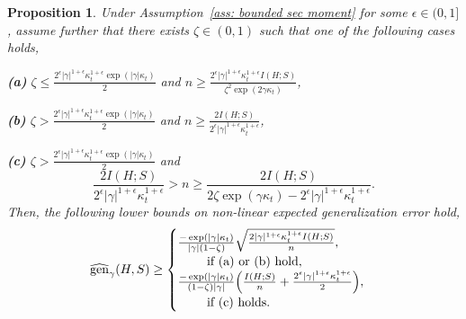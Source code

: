 \documentclass{article}
\theoremstyle{plain}
\theoremstyle{plain}
\newtheorem{proposition}[theorem]{Proposition}
\theoremstyle{definition}
\theoremstyle{remark}
\begin{document}
\begin{proposition}\label{prop: lower via Mutual V2 unbound}
Under Assumption~\ref{ass: bounded sec moment} for some $\epsilon\in(0,1]$, assume further that there exists $\zeta\in(0,1)$ such that one of the following cases holds,

\textbf{(a)} $\zeta \leq \frac{2^{\epsilon}|\gamma|^{1+\epsilon} \kappa_t^{1+\epsilon} \exp(|\gamma|\kappa_t)}{2}$ and  $n \geq \frac{2^{\epsilon}|\gamma|^{1+\epsilon} \kappa_t^{1+\epsilon} I(H;S)}{\zeta^2\exp(2\gamma \kappa_t)}$,

\textbf{(b)} $\zeta > \frac{2^{\epsilon}|\gamma|^{1+\epsilon} \kappa_t^{1+\epsilon} \exp(|\gamma|\kappa_t)}{2}$ and $n \geq \frac{2I(H;S)}{2^{\epsilon}|\gamma|^{1+\epsilon} \kappa_t^{1+\epsilon}}$,

\textbf{(c)} $\zeta > \frac{2^{\epsilon}|\gamma|^{1+\epsilon} \kappa_t^{1+\epsilon} \exp(|\gamma|\kappa_t)}{2}$ and $$\frac{2I(H;S)}{2^{\epsilon}|\gamma|^{1+\epsilon} \kappa_t^{1+\epsilon}} > n \geq \frac{2I(H;S)}{2\zeta \exp(\gamma\kappa_t)-2^{\epsilon}|\gamma|^{1+\epsilon} \kappa_t^{1+\epsilon}}.$$ 
    Then, the following lower bounds on non-linear expected generalization error hold,
\begin{equation*}
    \begin{split}
          \widehat{\mathrm{gen}}_{\gamma}(H,S)\geq  \begin{cases}
           \frac{-\exp(|\gamma| \kappa_t)}{|\gamma|(1-\zeta)} \sqrt{\frac{2|\gamma|^{1+\epsilon} \kappa_t^{1+\epsilon} I(H;S)}{n}}, \\
           \quad \quad  \mbox{ \text{if (a) or (b) hold,}}\\
              \frac{-\exp(|\gamma| \kappa_t)}{(1-\zeta) |\gamma|}\Big( \frac{ I(H;S)}{n}+\frac{2^{\epsilon}|\gamma|^{1+\epsilon} \kappa_t^{1+\epsilon}}{2}\Big),  \\
           \quad \quad  \mbox{ \text{if (c) holds}}.
          \end{cases}
    \end{split}
\end{equation*}
\end{proposition}
\end{document}
